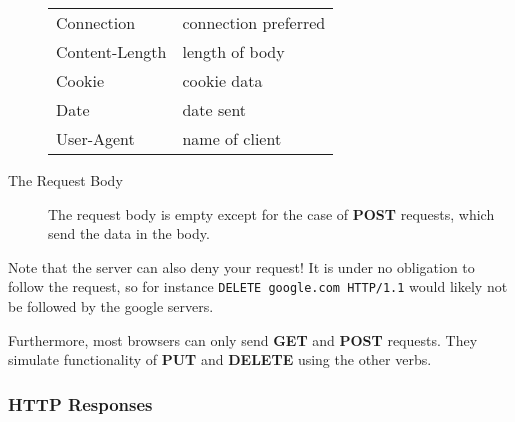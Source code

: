 \documentclass[11pt]{article}
\begin{document}
\begin{description}
\begin{tabular}{ l l }
  Connection & connection preferred \\

  Content-Length & length of body \\

  Cookie & cookie data \\

  Date & date sent \\

  User-Agent &  name of client \\
\end{tabular}
\item[The Request Body]
The request body is empty except for the case of \textbf{POST} requests, which send the data in the body.
\end{description}

Note that the server can also deny your request! It is under no obligation to follow the request, so for instance \texttt{DELETE google.com HTTP/1.1} would likely not be followed by the google servers.

Furthermore, most browsers can only send \textbf{GET} and \textbf{POST} requests. They simulate functionality of \textbf{PUT} and \textbf{DELETE} using the other verbs.

\subsubsection{HTTP Responses}
\end{document}
